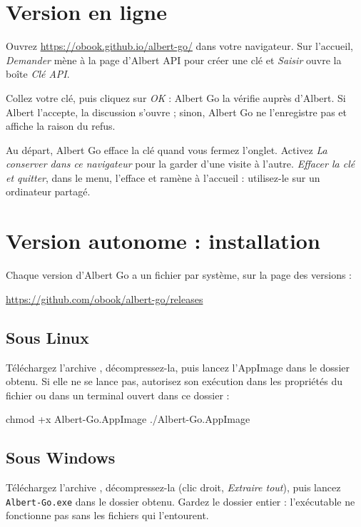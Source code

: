 \documentclass[a4paper, 11pt]{article}
\begin{document}
\section{Version en ligne}
\label{sec:en-ligne}

Ouvrez \url{https://obook.github.io/albert-go/} dans votre navigateur. Sur l'accueil, \emph{Demander} mène à la page d'Albert API pour créer une clé et \emph{Saisir} ouvre la boîte \emph{Clé API}.

Collez votre clé, puis cliquez sur \emph{OK} : Albert Go la vérifie auprès d'Albert. Si Albert l'accepte, la discussion s'ouvre ; sinon, Albert Go ne l'enregistre pas et affiche la raison du refus.

Au départ, Albert Go efface la clé quand vous fermez l'onglet. Activez \emph{La conserver dans ce navigateur} pour la garder d'une visite à l'autre. \emph{Effacer la clé et quitter}, dans le menu, l'efface et ramène à l'accueil : utilisez-le sur un ordinateur partagé.

\section{Version autonome : installation}
\label{sec:installation}

Chaque version d'Albert Go a un fichier par système, sur la page des versions :

\url{https://github.com/obook/albert-go/releases}

\subsection{Sous Linux}

Téléchargez l'archive , décompressez-la, puis lancez l'AppImage dans le dossier obtenu. Si elle ne se lance pas, autorisez son exécution dans les propriétés du fichier ou dans un terminal ouvert dans ce dossier :

\begin{plain_code}
chmod +x Albert-Go.AppImage
./Albert-Go.AppImage
\end{plain_code}

\subsection{Sous Windows}

Téléchargez l'archive , décompressez-la (clic droit, \emph{Extraire tout}), puis lancez \texttt{Albert-Go.exe} dans le dossier obtenu. Gardez le dossier entier : l'exécutable ne fonctionne pas sans les fichiers qui l'entourent.
\end{document}
